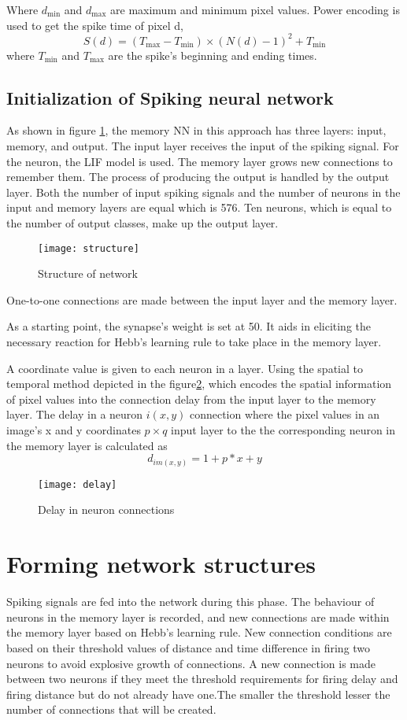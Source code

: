 Where $d_{\min}$ and $d_{\max}$ are maximum and minimum pixel values. Power
encoding is used to get the spike time of pixel d,
\begin{equation*}
    S(d)= (T_{\max}-T_{\min})\times{(N(d)-1)}^2 +T_{\min}
\end{equation*}
where $T_{\min}$ and $T_{\max}$ are the spike's beginning and ending times.
\subsection{Initialization of Spiking neural network}
As shown in figure \ref{structure}, the memory NN in this approach has three
layers: input, memory, and output. The input layer receives the input of the
spiking signal. For the neuron, the LIF model is used. The memory layer grows
new connections to remember them. The process of producing the output is
handled by the output layer. Both the number of input spiking signals and the
number of neurons in the input and memory layers are equal which is 576. Ten
neurons, which is equal to the number of output classes, make up the output
layer.
\begin{figure}[h!]
    \centering
    \texttt{[image: structure]}
    \caption{Structure of network}\label{structure}
\end{figure}

One-to-one connections are made between the input layer and the memory layer.

As a starting point, the synapse's weight is set at 50. It aids in eliciting
the necessary reaction for Hebb's learning rule\cite{hebbs} to take place in
the memory layer.

A coordinate value is given to each neuron in a layer. Using the spatial to
temporal method depicted in the figure\ref{delay}, which encodes the spatial
information of pixel values into the connection delay from the input layer to
the memory layer. The delay in a neuron $i(x,y)$ connection where the pixel
values in an image's x and y coordinates $p \times q$ input layer to the the
corresponding neuron in the memory layer is calculated as
\begin{equation*}
    d_{im(x,y)}=1+p*x+y
\end{equation*}
\begin{figure}[h!]
    \centering
    \texttt{[image: delay]}
    \caption{Delay in neuron connections}\label{delay}
\end{figure}
\section{Forming network structures}
Spiking signals are fed into the network during this phase. The behaviour of
neurons in the memory layer is recorded, and new connections are made within
the memory layer based on Hebb's learning rule\cite{hebbs}. New connection
conditions are based on their threshold values of distance and time difference
in firing two neurons to avoid explosive growth of connections. A new
connection is made between two neurons if they meet the threshold requirements
for firing delay and firing distance but do not already have one.The smaller
the threshold lesser the number of connections that will be created.

